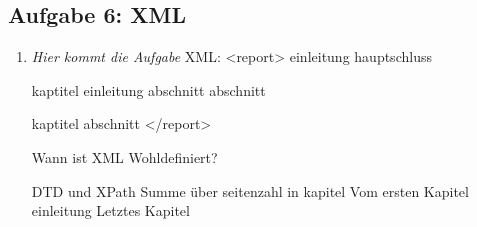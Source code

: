 \subsection{Aufgabe 6: XML}
\label{sec:Aufgabe6}
\begin{enumerate}[label=\alph*)]
    \item \textit{Hier kommt die Aufgabe}
    XML:
<report>
    einleitung
    hauptschluss
    
    kaptitel
        einleitung
        abschnitt
        abschnitt
        
    kaptitel
        abschnitt
</report>

Wann ist XML Wohldefiniert?

DTD und XPath
Summe über seitenzahl in kapitel
Vom ersten Kapitel einleitung
Letztes Kapitel
\end{enumerate}
